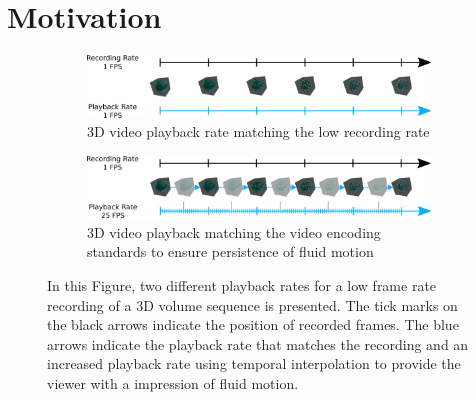 \section{Motivation}



































\begin{figure}[H]
    \centering
    \begin{subfigure}[b]{0.96\textwidth}
        \includegraphics[width=\textwidth]{images/01_introduction/motivation_temporal_superresolution_one.pdf}
        \caption{3D video playback rate matching the low recording rate}
    \end{subfigure}
    
	\vspace{1.0cm}
    
    \begin{subfigure}[b]{0.96\textwidth}
        \includegraphics[width=\textwidth]{images/01_introduction/motivation_temporal_superresolution_two.pdf}
        \caption{3D video playback matching the video encoding standards to ensure persistence of fluid motion}
    \end{subfigure}
    \caption[Concept of Temporal Super Resolution in a 3D Video Player]{In this Figure, two different playback rates for a low frame rate recording of a 3D volume sequence is presented. The tick marks on the black arrows indicate the position of recorded frames. The blue arrows indicate the playback rate that matches the recording  and an increased playback rate  using temporal interpolation to provide the viewer with a impression of fluid motion. }
\end{figure}

 \cite{VillanuevaEtAl:2016} 